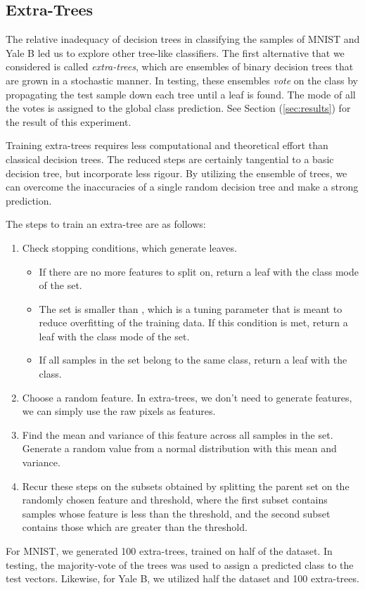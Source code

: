 \subsection{Extra-Trees}

The relative inadequacy of decision trees in classifying the samples of MNIST and Yale B led us to explore other tree-like classifiers. The first alternative that we considered is called \emph{extra-trees}, which are ensembles of binary decision trees that are grown in a stochastic manner. In testing, these ensembles \emph{vote} on the class by propagating the test sample down each tree until a leaf is found. The mode of all the votes is assigned to the global class prediction. See Section (\ref{sec:results}) for the result of this experiment. 

Training extra-trees requires less computational and theoretical effort than classical decision trees. The reduced steps are certainly tangential to a basic decision tree, but incorporate less rigour. By utilizing the ensemble of trees, we can overcome the inaccuracies of a single random decision tree and make a strong prediction. 

The steps to train an extra-tree are as follows:
%
\begin{enumerate}
\item Check stopping conditions, which generate leaves.
%
  \begin{itemize}
  \item If there are no more features to split on, return a leaf with the class mode of the set. 
  \item The set is smaller than , which is a tuning parameter that is meant to reduce overfitting of the training data. If this condition is met, return a leaf with the class mode of the set.
  \item If all samples in the set belong to the same class, return a leaf with the class.
  \end{itemize}
\item Choose a random feature. In extra-trees, we don't need to generate features, we can simply use the raw pixels as features. 
\item Find the mean and variance of this feature across all samples in the set. Generate a random value from a normal distribution with this mean and variance. 
\item Recur these steps on the subsets obtained by splitting the parent set on the randomly chosen feature and threshold, where the first subset contains samples whose feature is less than the threshold, and the second subset contains those which are greater than the threshold.
\end{enumerate}

For MNIST, we generated 100 extra-trees, trained on half of the dataset. In testing, the majority-vote of the trees was used to assign a predicted class to the test vectors. Likewise, for Yale B, we utilized half the dataset and 100 extra-trees.
